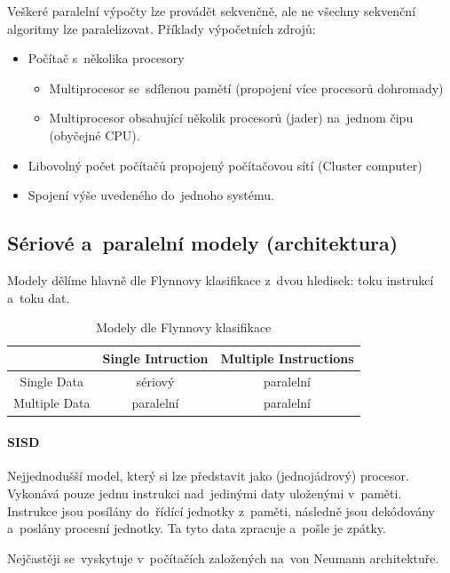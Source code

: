 Veškeré paralelní výpočty lze provádět sekvenčně, ale ne všechny sekvenční algoritmy lze paralelizovat. Příklady výpočetních zdrojů:
\begin{itemize}[noitemsep]
	\item Počítač s~několika procesory
	\begin{itemize}[noitemsep]
		\item Multiprocesor se~sdílenou pamětí (propojení více procesorů dohromady)
		\item Multiprocesor obsahující několik procesorů (jader) na~jednom čipu (obyčejné CPU).
	\end{itemize}
	\item Libovolný počet počítačů propojený počítačovou sítí (Cluster computer)
	\item Spojení výše uvedeného do~jednoho systému.
\end{itemize}

\subsection{Sériové a~paralelní modely (architektura)}

Modely dělíme hlavně dle Flynnovy klasifikace z~dvou hledisek: toku instrukcí a~toku dat.

\begin{table}[ht]
	\centering
	\caption{Modely dle Flynnovy klasifikace}

	\begin{tabular}{c|cc}
	{}            & Single Intruction & Multiple Instructions \\
	\hline
	Single Data   & sériový           & paralelní             \\
	Multiple Data & paralelní         & paralelní             \\
	\end{tabular}
\end{table}

\paragraph{SISD}

Nejjednodušší model, který si lze představit jako (jednojádrový) procesor. Vykonává pouze jednu instrukci nad~jedinými daty uloženými v~paměti. Instrukce jsou posílány do~řídící jednotky z~paměti, následně jsou dekódovány a~poslány procesní jednotky. Ta tyto data zpracuje a~pošle je zpátky.

Nejčastěji se~vyskytuje v~počítačích založených na~von Neumann architektuře.

